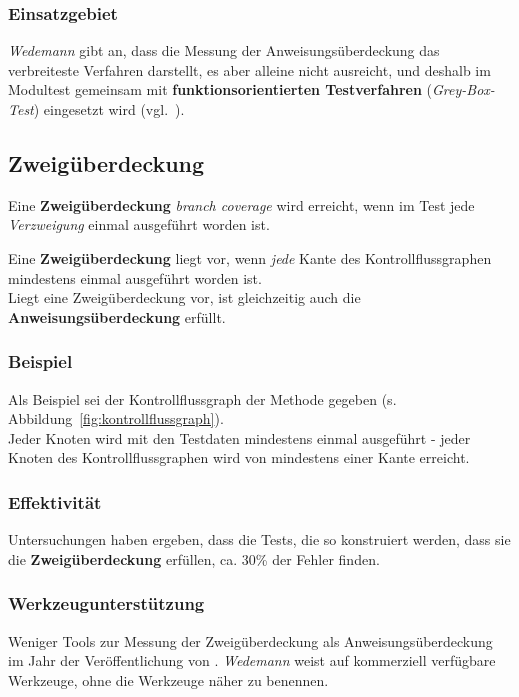 \subsubsection*{Einsatzgebiet}
\textit{Wedemann} gibt an, dass die Messung der Anweisungsüberdeckung das verbreiteste Verfahren darstellt, es aber alleine nicht ausreicht, und deshalb im Modultest gemeinsam mit \textbf{funktionsorientierten Testverfahren} (\textit{Grey-Box-Test}) eingesetzt wird (vgl.~\cite[51]{Wed09c}).

\subsection{Zweigüberdeckung}

Eine \textbf{Zweigüberdeckung} \textit{branch coverage} wird erreicht, wenn im Test jede \textit{Verzweigung} einmal ausgeführt worden ist.

\begin{tcolorbox}[title=Zweigüberdeckung]
Eine \textbf{Zweigüberdeckung} liegt vor, wenn \textit{jede} Kante des Kontrollflussgraphen mindestens einmal ausgeführt worden ist.\\
    Liegt eine Zweigüberdeckung vor, ist gleichzeitig auch die \textbf{Anweisungsüberdeckung} erfüllt.
\end{tcolorbox}

\subsubsection*{Beispiel}
Als Beispiel sei der Kontrollflussgraph der Methode  gegeben (s. Abbildung~\ref{fig:kontrollflussgraph}).\\
Jeder Knoten wird mit den Testdaten  mindestens einmal ausgeführt - jeder Knoten des Kontrollflussgraphen wird von mindestens einer Kante erreicht.

\subsubsection*{Effektivität}
Untersuchungen haben ergeben, dass die Tests, die so konstruiert werden, dass sie die \textbf{Zweigüberdeckung} erfüllen, ca. 30\% der Fehler finden.

\subsubsection*{Werkzeugunterstützung}
Weniger Tools zur Messung der Zweigüberdeckung als Anweisungsüberdeckung im Jahr der Veröffentlichung von \cite{Wed09c}. \textit{Wedemann} weist auf kommerziell verfügbare Werkzeuge, ohne die Werkzeuge näher zu benennen.

